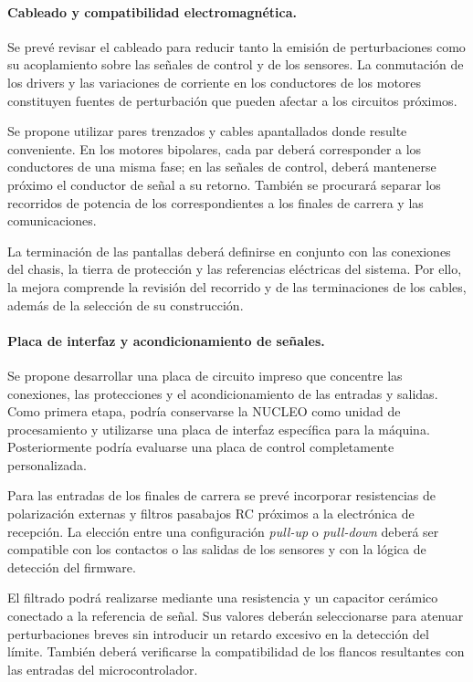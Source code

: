 \documentclass[blue,fullpaper]{ludusofficial}  %
\begin{document}
\paragraph{Cableado y compatibilidad electromagnética.}

Se prevé revisar el cableado para reducir tanto
la emisión de perturbaciones como su acoplamiento
sobre las señales de control y de los sensores.
La conmutación de los drivers y las variaciones
de corriente en los conductores de los motores
constituyen fuentes de perturbación que pueden
afectar a los circuitos próximos.

Se propone utilizar pares trenzados y cables
apantallados donde resulte conveniente.
En los motores bipolares, cada par deberá
corresponder a los conductores de una misma fase;
en las señales de control, deberá mantenerse
próximo el conductor de señal a su retorno.
También se procurará separar los recorridos
de potencia de los correspondientes a los
finales de carrera y las comunicaciones.

La terminación de las pantallas deberá definirse
en conjunto con las conexiones del chasis,
la tierra de protección y las referencias
eléctricas del sistema. Por ello, la mejora
comprende la revisión del recorrido y de las
terminaciones de los cables, además de la
selección de su construcción.

\paragraph{Placa de interfaz y acondicionamiento
de señales.}

Se propone desarrollar una placa de circuito
impreso que concentre las conexiones, las
protecciones y el acondicionamiento de las
entradas y salidas. Como primera etapa,
podría conservarse la NUCLEO como unidad
de procesamiento y utilizarse una placa
de interfaz específica para la máquina.
Posteriormente podría evaluarse una placa
de control completamente personalizada.

Para las entradas de los finales de carrera
se prevé incorporar resistencias de polarización
externas y filtros pasabajos RC próximos
a la electrónica de recepción. La elección
entre una configuración \textit{pull-up}
o \textit{pull-down} deberá ser compatible
con los contactos o las salidas de los sensores
y con la lógica de detección del firmware.

El filtrado podrá realizarse mediante una
resistencia y un capacitor cerámico conectado
a la referencia de señal. Sus valores deberán
seleccionarse para atenuar perturbaciones breves
sin introducir un retardo excesivo en la
detección del límite. También deberá verificarse
la compatibilidad de los flancos resultantes
con las entradas del microcontrolador.
\end{document}
